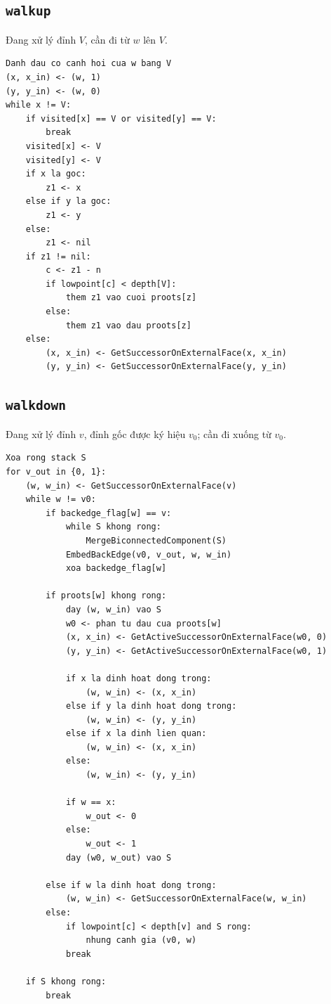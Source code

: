 \documentclass[11pt]{article}
\begin{document}
\subsection*{\texttt{walkup}}

Đang xử lý đỉnh \(V\), cần đi từ \(w\) lên \(V\).

\begin{verbatim}
Danh dau co canh hoi cua w bang V
(x, x_in) <- (w, 1)
(y, y_in) <- (w, 0)
while x != V:
    if visited[x] == V or visited[y] == V:
        break
    visited[x] <- V
    visited[y] <- V
    if x la goc:
        z1 <- x
    else if y la goc:
        z1 <- y
    else:
        z1 <- nil
    if z1 != nil:
        c <- z1 - n
        if lowpoint[c] < depth[V]:
            them z1 vao cuoi proots[z]
        else:
            them z1 vao dau proots[z]
    else:
        (x, x_in) <- GetSuccessorOnExternalFace(x, x_in)
        (y, y_in) <- GetSuccessorOnExternalFace(y, y_in)
\end{verbatim}

\subsection*{\texttt{walkdown}}

Đang xử lý đỉnh \(v\), đỉnh gốc được ký hiệu \(v_0\); cần đi xuống từ \(v_0\).

\begin{verbatim}
Xoa rong stack S
for v_out in {0, 1}:
    (w, w_in) <- GetSuccessorOnExternalFace(v)
    while w != v0:
        if backedge_flag[w] == v:
            while S khong rong:
                MergeBiconnectedComponent(S)
            EmbedBackEdge(v0, v_out, w, w_in)
            xoa backedge_flag[w]

        if proots[w] khong rong:
            day (w, w_in) vao S
            w0 <- phan tu dau cua proots[w]
            (x, x_in) <- GetActiveSuccessorOnExternalFace(w0, 0)
            (y, y_in) <- GetActiveSuccessorOnExternalFace(w0, 1)

            if x la dinh hoat dong trong:
                (w, w_in) <- (x, x_in)
            else if y la dinh hoat dong trong:
                (w, w_in) <- (y, y_in)
            else if x la dinh lien quan:
                (w, w_in) <- (x, x_in)
            else:
                (w, w_in) <- (y, y_in)

            if w == x:
                w_out <- 0
            else:
                w_out <- 1
            day (w0, w_out) vao S

        else if w la dinh hoat dong trong:
            (w, w_in) <- GetSuccessorOnExternalFace(w, w_in)
        else:
            if lowpoint[c] < depth[v] and S rong:
                nhung canh gia (v0, w)
            break

    if S khong rong:
        break
\end{verbatim}
\end{document}

